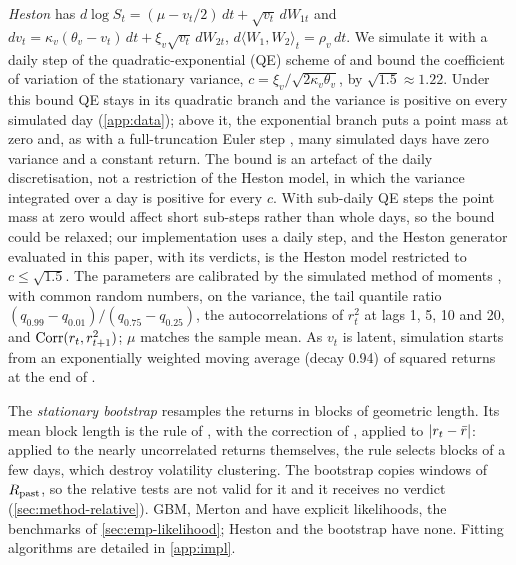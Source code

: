 \emph{Heston} \citep{heston1993closed} has $d\log S_t=(\mu-v_t/2)\,dt+\sqrt{v_t}\,dW_{1t}$ and
$dv_t=\kappa_v(\theta_v-v_t)\,dt+\xi_v\sqrt{v_t}\,dW_{2t}$, $d\langle W_1,W_2\rangle_t=\rho_v\,dt$.
We simulate it with a daily step of the quadratic-exponential (QE) scheme of
\citet{andersen_2008_simple} and bound the coefficient of variation of the stationary variance,
$c=\xi_v/\sqrt{2\kappa_v\theta_v}$, by $\sqrt{1.5}\approx1.22$. Under this bound QE stays in its
quadratic branch and the variance is positive on every simulated day (\cref{app:data}); above
it, the exponential branch puts a point mass at zero and, as with a full-truncation Euler step
\citep{lord2010comparison}, many simulated days have zero variance and a constant return. The
bound is an artefact of the daily discretisation, not a restriction of the Heston model, in
which the variance integrated over a day is positive for every $c$. With sub-daily QE steps the
point mass at zero would affect short sub-steps rather than whole days, so the bound could be
relaxed; our implementation uses a daily step, and the Heston generator evaluated in this paper,
with its verdicts, is the Heston model restricted to $c\le\sqrt{1.5}$. The parameters are
calibrated by the simulated method of
moments \citep{duffie1993simulated}, with common random numbers, on the variance, the tail
quantile ratio $(q_{0.99}-q_{0.01})/(q_{0.75}-q_{0.25})$, the autocorrelations of $r_t^2$ at lags
1, 5, 10 and 20, and $\operatorname{Corr}(r_t,r_{t+1}^2)$; $\mu$ matches the sample mean. As $v_t$ is latent,
simulation starts from an exponentially weighted moving average (decay 0.94) of squared returns
at the end of \TRAIN{}.

The \emph{stationary bootstrap} \citep{politis1994stationary} resamples the \TRAIN{} returns in
blocks of geometric length. Its mean block length is the rule of \citet{politis2004automatic},
with the correction of \citet{patton2009correction}, applied to $\lvert r_t-\bar r\rvert$: applied to
the nearly uncorrelated returns themselves, the rule selects blocks of a few days, which destroy
volatility clustering. The bootstrap copies windows of $R_{\mathrm{past}}$, so the relative tests are not
valid for it and it receives no verdict (\cref{sec:method-relative}). GBM, Merton and \GARCHt{}
have explicit likelihoods, the benchmarks of \cref{sec:emp-likelihood}; Heston and the bootstrap
have none. Fitting algorithms are detailed in \cref{app:impl}.

